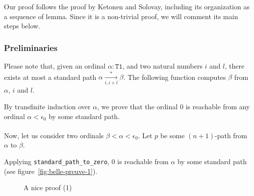 Our proof follows the proof by Ketonen and Solovay, including its organization as a sequence of lemma.  Since it is a non-trivial proof, we will comment its main steps below.

\subsubsection*{Preliminaries}


Please note that, given an ordinal $\alpha:\texttt{T1}$, and two natural numbers $i$ and $l$, there exists at most a standard path $\alpha \xrightarrow [i,i+l]{*} \beta$.
The following function computes $\beta$ from $\alpha$, $i$ and $l$.






By transfinite induction over  $\alpha$, we prove that the ordinal $0$ is reachable from any ordinal $\alpha<\epsilon_0$ by some standard path.




\paragraph*{}
Now, let us consider two ordinals  $\beta<\alpha<\epsilon_0$.  Let $p$  be some $(n+1)$-path from $\alpha$ to $\beta$.




Applying \texttt{standard\_path\_to\_zero}, $0$ is reachable from $\alpha$ by some standard path  (see figure~\vref{fig:belle-preuve-1}).

\begin{figure}[h]
  \centering
 
\caption{A nice proof (1)}
  \label{fig:belle-preuve-1}
\end{figure}


